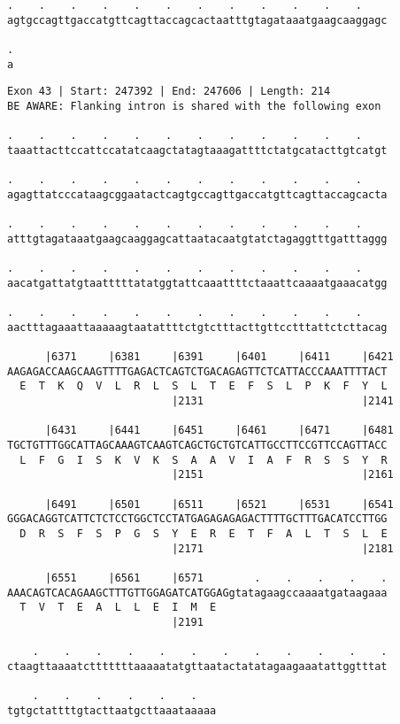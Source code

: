 \documentclass{article}
\begin{document}
\newpage
\begin{Verbatim}[fontfamily=courier]
.    .    .    .    .    .    .    .    .    .    .    .    
agtgccagttgaccatgttcagttaccagcactaatttgtagataaatgaagcaaggagc

.
a
\end{Verbatim}
\newpage
\begin{Verbatim}[fontfamily=courier]
Exon 43 | Start: 247392 | End: 247606 | Length: 214
BE AWARE: Flanking intron is shared with the following exon

.    .    .    .    .    .    .    .    .    .    .    .    
taaattacttccattccatatcaagctatagtaaagattttctatgcatacttgtcatgt

.    .    .    .    .    .    .    .    .    .    .    .    
agagttatcccataagcggaatactcagtgccagttgaccatgttcagttaccagcacta

.    .    .    .    .    .    .    .    .    .    .    .    
atttgtagataaatgaagcaaggagcattaatacaatgtatctagaggtttgatttaggg

.    .    .    .    .    .    .    .    .    .    .    .    
aacatgattatgtaatttttatatggtattcaaattttctaaattcaaaatgaaacatgg

.    .    .    .    .    .    .    .    .    .    .    .    
aactttagaaattaaaaagtaatattttctgtctttacttgttcctttattctcttacag

      |6371     |6381     |6391     |6401     |6411     |6421
AAGAGACCAAGCAAGTTTTGAGACTCAGTCTGACAGAGTTCTCATTACCCAAATTTTACT
  E  T  K  Q  V  L  R  L  S  L  T  E  F  S  L  P  K  F  Y  L
                          |2131                         |2141

      |6431     |6441     |6451     |6461     |6471     |6481
TGCTGTTTGGCATTAGCAAAGTCAAGTCAGCTGCTGTCATTGCCTTCCGTTCCAGTTACC
  L  F  G  I  S  K  V  K  S  A  A  V  I  A  F  R  S  S  Y  R
                          |2151                         |2161

      |6491     |6501     |6511     |6521     |6531     |6541
GGGACAGGTCATTCTCTCCTGGCTCCTATGAGAGAGAGACTTTTGCTTTGACATCCTTGG
  D  R  S  F  S  P  G  S  Y  E  R  E  T  F  A  L  T  S  L  E
                          |2171                         |2181

      |6551     |6561     |6571        .    .    .    .    .
AAACAGTCACAGAAGCTTTGTTGGAGATCATGGAGgtatagaagccaaaatgataagaaa
  T  V  T  E  A  L  L  E  I  M  E                           
                          |2191                             

    .    .    .    .    .    .    .    .    .    .    .    .
ctaagttaaaatctttttttaaaaatatgttaatactatatagaagaaatattggtttat

    .    .    .    .    .    .   
tgtgctattttgtacttaatgcttaaataaaaa
\end{Verbatim}
\end{document}
